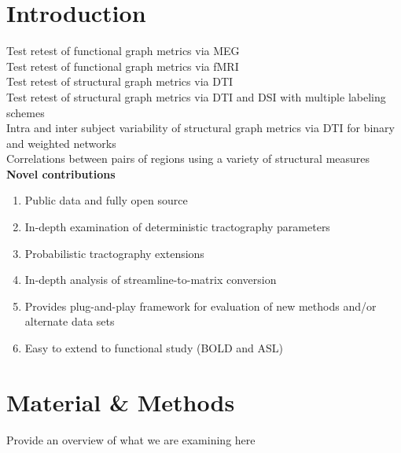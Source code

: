 \documentclass{frontiersSCNS} %
\begin{document}
\section{Introduction}

Test retest of functional graph metrics via MEG \cite{Deuker2009}\\
Test retest of functional graph metrics via fMRI \cite{Telesford2010}\\
Test retest of structural graph metrics via DTI \cite{Owen2013BC}\\ 
Test retest of structural graph metrics via DTI and DSI with multiple labeling schemes \cite{Bassett2011N}\\
Intra and inter subject variability of structural graph metrics via DTI for binary and weighted networks \cite{Cheng2012N}\\
Correlations between pairs of regions using a variety of structural measures \cite{Irimia2012N}\\

\textbf{Novel contributions}
\begin{enumerate}
\item Public data and fully open source
\item In-depth examination of deterministic tractography parameters
\item Probabilistic tractography extensions
\item In-depth analysis of streamline-to-matrix conversion
\item Provides plug-and-play framework for evaluation of new methods and/or alternate data sets
\item Easy to extend to functional study (BOLD and ASL) 
\end{enumerate}


\section{Material \& Methods}
Provide an overview of what we are examining here
\end{document}
